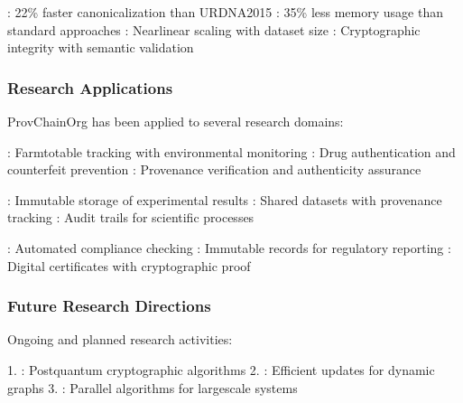 \documentclass[letterpaper,10pt,english]{sphinxmanual}
\begin{document}
\sphinxAtStartPar
{}
\sphinxhyphen{} : 22\% faster canonicalization than URDNA2015
\sphinxhyphen{} : 35\% less memory usage than standard approaches
\sphinxhyphen{} : Near\sphinxhyphen{}linear scaling with dataset size
\sphinxhyphen{} : Cryptographic integrity with semantic validation


\subsubsection{Research Applications}
\label{\detokenize{research/index:research-applications}}
\sphinxAtStartPar
ProvChainOrg has been applied to several research domains:

\sphinxAtStartPar
{}
\sphinxhyphen{} : Farm\sphinxhyphen{}to\sphinxhyphen{}table tracking with environmental monitoring
\sphinxhyphen{} : Drug authentication and counterfeit prevention
\sphinxhyphen{} : Provenance verification and authenticity assurance

\sphinxAtStartPar
{}
\sphinxhyphen{} : Immutable storage of experimental results
\sphinxhyphen{} : Shared datasets with provenance tracking
\sphinxhyphen{} : Audit trails for scientific processes

\sphinxAtStartPar
{}
\sphinxhyphen{} : Automated compliance checking
\sphinxhyphen{} : Immutable records for regulatory reporting
\sphinxhyphen{} : Digital certificates with cryptographic proof


\subsubsection{Future Research Directions}
\label{\detokenize{research/index:future-research-directions}}
\sphinxAtStartPar
Ongoing and planned research activities:

\sphinxAtStartPar
{}
1. : Post\sphinxhyphen{}quantum cryptographic algorithms
2. : Efficient updates for dynamic graphs
3. : Parallel algorithms for large\sphinxhyphen{}scale systems
\end{document}
